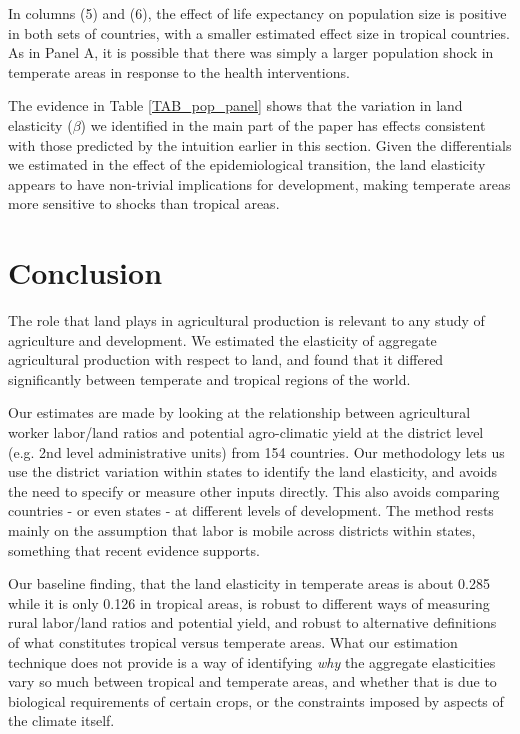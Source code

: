\documentclass[11pt]{article}
\begin{document}
In columns (5) and (6), the effect of life expectancy on population size is positive in both sets of countries, with a smaller estimated effect size in tropical countries. As in Panel A, it is possible that there was simply a larger population shock in temperate areas in response to the health interventions. 

The evidence in Table \ref{TAB_pop_panel} shows that the variation in land elasticity ($\beta$) we identified in the main part of the paper has effects consistent with those predicted by the intuition earlier in this section. Given the differentials we estimated in the effect of the epidemiological transition, the land elasticity appears to have non-trivial implications for development, making temperate areas more sensitive to shocks than tropical areas.

\section{Conclusion}
The role that land plays in agricultural production is relevant to any study of agriculture and development. We estimated the elasticity of aggregate agricultural production with respect to land, and found that it differed significantly between temperate and tropical regions of the world.

Our estimates are made by looking at the relationship between agricultural worker labor/land ratios and potential agro-climatic yield at the district level (e.g. 2nd level administrative units) from 154 countries. Our methodology lets us use the district variation within states to identify the land elasticity, and avoids the need to specify or measure other inputs directly. This also avoids comparing countries - or even states - at different levels of development. The method rests mainly on the assumption that labor is mobile across districts within states, something that recent evidence supports. 

Our baseline finding, that the land elasticity in temperate areas is about 0.285 while it is only 0.126 in tropical areas, is robust to different ways of measuring rural labor/land ratios and potential yield, and robust to alternative definitions of what constitutes tropical versus temperate areas. What our estimation technique does not provide is a way of identifying \textit{why} the aggregate elasticities vary so much between tropical and temperate areas, and whether that is due to biological requirements of certain crops, or the constraints imposed by aspects of the climate itself.
\end{document}
